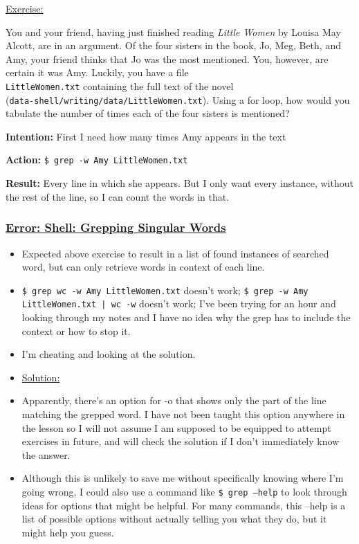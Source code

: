 \documentclass[12pt]{article}
\begin{document}
\begin{addmargin}[1cm]{0cm}
\color{gray}
\underline{Exercise:}

You and your friend, having just finished reading \textit{Little Women} by Louisa May Alcott, are in an argument. Of the four sisters in the book, Jo, Meg, Beth, and Amy, your friend thinks that Jo was the most mentioned. You, however, are certain it was Amy. Luckily, you have a file \\\texttt{LittleWomen.txt} containing the full text of the novel \\(\texttt{data-shell/writing/data/LittleWomen.txt}). Using a for loop, how would you tabulate the number of times each of the four sisters is mentioned?

\color{black}\vspace{-0.5em}
\textbf{Intention:} First I need how many times Amy appears in the text

\textbf{Action:} \texttt{\$ grep -w Amy LittleWomen.txt}

\textbf{Result:} Every line in which she appears. But I only want every instance, without the rest of the line, so I can count the words in that.

{\subsubsection{\texorpdfstring{\underline{Error: Shell: Grepping Singular Words}}{}}\label{error:er18}
\begin{itemize}
  \item Expected above exercise to result in a list of found instances of searched word, but can only retrieve words in context of each line.
  \item \texttt{\$ grep wc -w Amy LittleWomen.txt} doesn't work; \texttt{\$ grep -w Amy LittleWomen.txt | wc -w} doesn't work; I've been trying for an hour and looking through my notes and I have no idea why the grep has to include the context or how to stop it.
  \item I'm cheating and looking at the solution.
\end{itemize}
\begin{itemize}
\renewcommand{\labelitemi}{}
\item \underline{Solution:}
\renewcommand{\labelitemi}{$\bullet$}
  \item Apparently, there's an option for -o that shows only the part of the line matching the grepped word. I have not been taught this option anywhere in the lesson so I will not assume I am supposed to be equipped to attempt exercises in future, and will check the solution if I don't immediately know the answer.
  \item Although this is unlikely to save me without specifically knowing where I'm going wrong, I could also use a command like \texttt{\$ grep --help} to look through ideas for options that might be helpful. For many commands, this --help is a list of possible options without actually telling you what they do, but it might help you guess.
\end{itemize}}




\end{addmargin}
\end{document}
